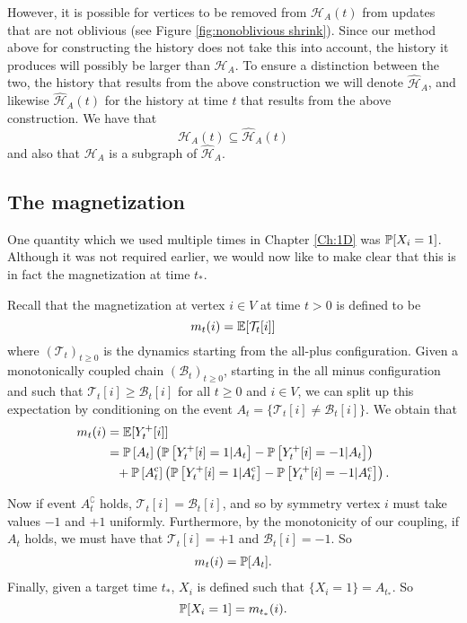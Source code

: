 However, it is possible for vertices to be removed from $\mathcal{H}_A(t)$ from updates that are not oblivious (see Figure \ref{fig:nonoblivious shrink}). Since our method above for constructing the history does not take this into account, the history it produces will possibly be larger than $\mathcal{H}_A$. To ensure a distinction between the two, the history that results from the above construction we will denote $\hat{\mathcal{H}}_A$, and likewise $\hat{\mathcal{H}}_A(t)$ for the history at time $t$ that results from the above construction. We have that
\begin{equation}
	\mathcal{H}_A(t) \subseteq \hat{\mathcal{H}}_A(t)
\end{equation}
and also that $\mathcal{H}_A$ is a subgraph of $\hat{\mathcal{H}}_A$.

\subsection{The magnetization}
One quantity which we used multiple times in Chapter \ref{Ch:1D} was $\mathbb{P}[X_i = 1]$. Although it was not required earlier, we would now like to make clear that this is in fact the magnetization at time $t_*$. 

Recall that the magnetization at vertex $i \in V$ at time $t > 0$ is defined to be
\begin{equation}
	m_t(i) = \mathbb{E}[\mathcal{T}_t[i]]
\end{equation}
where $(\mathcal{T}_t)_{t \geq 0}$ is the dynamics starting from the all-plus configuration. %
Given a monotonically coupled chain $(\mathcal{B}_t)_{t\geq0}$, starting in the all minus configuration and such that $\mathcal{T}_t[i] \geq \mathcal{B}_t[i]$ for all $t\geq 0$ and $i \in V$, we can split up this expectation by conditioning on the event $A_t = \{\mathcal{T}_t[i] \neq \mathcal{B}_t[i]\}$. We obtain that
\begin{align}
	m_t(i) &= \mathbb{E}[Y_t^+[i]]\\
	&= \mathbb{P}\left[A_t\right] \left(\mathbb{P}\left[Y_t^+[i] = 1 | A_t\right] - \mathbb{P}\left[Y_t^+[i] = -1|A_t\right]\right)  \\
	&\phantom{= } + \mathbb{P}\left[A_t^{\mathrm{c}}\right] \left( \mathbb{P}\left[Y_t^+[i] = 1 |A_t^{\mathrm{c}}\right] - \mathbb{P}\left[Y_t^+[i] = -1|A_t^{\mathrm{c}}\right] \right). \notag
\end{align}

Now if event $A_t^\complement$ holds, $\mathcal{T}_t[i] = \mathcal{B}_t[i]$, and so by symmetry vertex $i$ must take values $-1$ and $+1$ uniformly. Furthermore, by the monotonicity of our coupling, if $A_t$ holds, we must have that $\mathcal{T}_t[i] = +1$ and $\mathcal{B}_t[i] = -1$.
So
\begin{align}
	m_t(i) = \mathbb{P}[A_t].
\end{align}
Finally, given a target time $t_*$, $X_i$ is defined such that $\{X_i = 1\} = A_{t_*}$. So 
\begin{equation}
	\label{eq:prob X_i = 1 is m_t*}
	\mathbb{P}[X_i = 1] = m_{t_*}(i).	
\end{equation}

